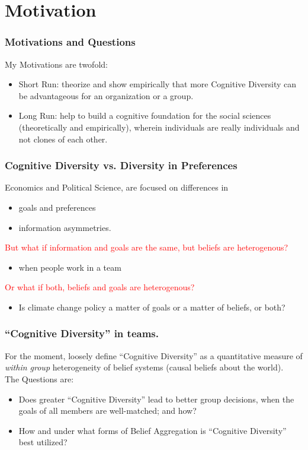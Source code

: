 \documentclass{beamer}
\begin{document}
\section{Motivation}
\begin{frame}
\frametitle{Motivations and Questions}
My Motivations are twofold:
\begin{itemize}
\item Short Run: theorize and show empirically that more Cognitive Diversity can be advantageous for an organization or a group.
\item Long Run: help to build a cognitive foundation for the social sciences (theoretically and empirically), wherein individuals are really individuals and not clones of each other.
\end{itemize}
\end{frame}
\begin{frame}
\frametitle{Cognitive Diversity vs. Diversity in Preferences}
Economics and Political Science, are focused on differences in
\begin{itemize}
\item goals and preferences
\item information asymmetries.
\end{itemize}
\textcolor{red}{But what if information and goals are the same, but beliefs are heterogenous?}
\begin{itemize}
\item when people work in a team
\end{itemize}
\textcolor{red}{Or what if both, beliefs and goals are heterogenous?}
\begin{itemize}
\item Is climate change policy a matter of goals or a matter of beliefs, or both?
\end{itemize}
\end{frame}
\begin{frame}
\frametitle{``Cognitive Diversity'' in teams.}
For the moment, loosely define ``Cognitive Diversity'' as a quantitative measure of \textit{within group} heterogeneity of belief systems (causal beliefs about the world).\\

The Questions are:\\
\begin{itemize}
\item Does greater ``Cognitive Diversity'' lead to better group decisions, when the goals of all members are well-matched; and how?
\item How and under what forms of Belief Aggregation is ``Cognitive Diversity'' best utilized?
\end{itemize}
\end{frame}
\end{document}

